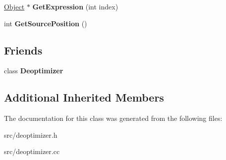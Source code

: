 \begin{DoxyCompactItemize}
\item 
\hypertarget{classv8_1_1internal_1_1_deoptimized_frame_info_a764008b227ff299ca4246b63eb4ecb90}{}\hyperlink{classv8_1_1internal_1_1_object}{Object} $\ast$ {\bfseries Get\+Expression} (int index)\label{classv8_1_1internal_1_1_deoptimized_frame_info_a764008b227ff299ca4246b63eb4ecb90}

\item 
\hypertarget{classv8_1_1internal_1_1_deoptimized_frame_info_a1f7e7515df0cf92d77692f3861eeab5a}{}int {\bfseries Get\+Source\+Position} ()\label{classv8_1_1internal_1_1_deoptimized_frame_info_a1f7e7515df0cf92d77692f3861eeab5a}

\end{DoxyCompactItemize}
\subsection*{Friends}
\begin{DoxyCompactItemize}
\item 
\hypertarget{classv8_1_1internal_1_1_deoptimized_frame_info_aa89911581cd6ded032f998021aef9e5c}{}class {\bfseries Deoptimizer}\label{classv8_1_1internal_1_1_deoptimized_frame_info_aa89911581cd6ded032f998021aef9e5c}

\end{DoxyCompactItemize}
\subsection*{Additional Inherited Members}


The documentation for this class was generated from the following files\+:\begin{DoxyCompactItemize}
\item 
src/deoptimizer.\+h\item 
src/deoptimizer.\+cc\end{DoxyCompactItemize}

